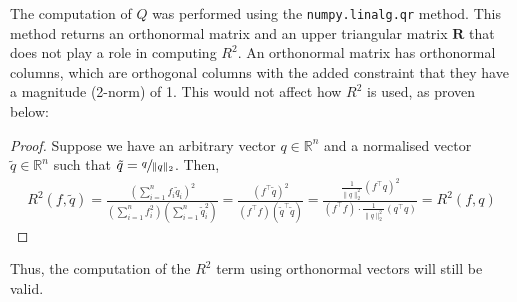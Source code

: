 \documentclass[12pt, twoside, a4paper]{report}
\begin{document}

The computation of $Q$ was performed using the \texttt{numpy.linalg.qr} method. This method returns an orthonormal matrix and an upper triangular matrix $\boldsymbol R$ that does not play a role in computing $R^2$. An orthonormal matrix has orthonormal columns, which are orthogonal columns with the added constraint that they have a magnitude (2-norm) of 1. This would not affect how $R^2$ is used, as proven below:


\begin{proof}
Suppose we have an arbitrary vector $q \in \mathbb{R}^n$ and a normalised vector $\tilde{q} \in \mathbb{R}^n$ such that $\tilde{q} = \sfrac{q}{\| q \|_2}$. Then,
\begin{align*}
R^2(f, \tilde{q}) = \frac{\left( \sum_{i=1}^n f_i \tilde{q}_i \right)^2}{\left(\sum_{i=1}^n f_i^2 \right) \left( \sum_{i=1}^n \tilde{q}_i^2 \right)}
= \frac{\left( f^\top \tilde{q} \right)^2}{(f^\top f)(\tilde{q}^\top \tilde{q})}
= \frac{\frac{1}{\| q \|^2_2} \left( f^\top q \right)^2}{(f^\top f) \cdot \frac{1}{\| q \|^2_2} \left( q^\top q \right)} = R^2(f, q)
\end{align*}
\end{proof}

Thus, the computation of the $R^2$ term using orthonormal vectors will still be valid.

\end{document}

